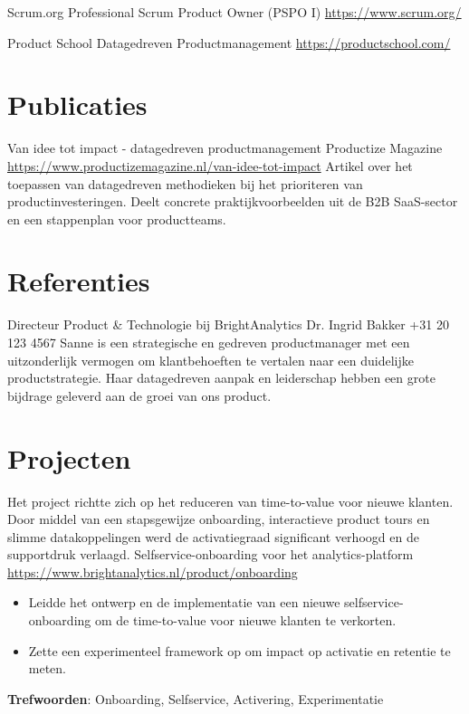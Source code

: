 \documentclass[a4paper, serif, 10pt]{moderncv}
\begin{document}
        {Scrum.org}
        {Professional Scrum Product Owner (PSPO I)}
        {\url{https://www.scrum.org/}}
        {}
        {}

        {Product School}
        {Datagedreven Productmanagement}
        {\url{https://productschool.com/}}
        {}
        {}
\section{Publicaties}

        {Van idee tot impact - datagedreven productmanagement}
        {Productize Magazine}
        {\url{https://www.productizemagazine.nl/van-idee-tot-impact}}
        {}
        {Artikel over het toepassen van datagedreven methodieken bij het prioriteren van productinvesteringen. Deelt concrete praktijkvoorbeelden uit de B2B SaaS-sector en een stappenplan voor productteams.}
\section{Referenties}

        {Directeur Product \& Technologie bij BrightAnalytics}
        {Dr. Ingrid Bakker}
        {+31 20 123 4567}
        {}
        {Sanne is een strategische en gedreven productmanager met een uitzonderlijk vermogen om klantbehoeften te vertalen naar een duidelijke productstrategie. Haar datagedreven aanpak en leiderschap hebben een grote bijdrage geleverd aan de groei van ons product.}
\section{Projecten}

        {Het project richtte zich op het reduceren van time-to-value voor nieuwe klanten. Door middel van een stapsgewijze onboarding, interactieve product tours en slimme datakoppelingen werd de activatiegraad significant verhoogd en de supportdruk verlaagd.
}
        {Selfservice-onboarding voor het analytics-platform}
        {\url{https://www.brightanalytics.nl/product/onboarding}}
        {}
        {\begin{itemize}
\item Leidde het ontwerp en de implementatie van een nieuwe selfservice-onboarding om de time-to-value voor nieuwe klanten te verkorten.
\item Zette een experimenteel framework op om impact op activatie en retentie te meten.
\end{itemize}
\textbf{Trefwoorden}: Onboarding, Selfservice, Activering, Experimentatie}
\end{document}
